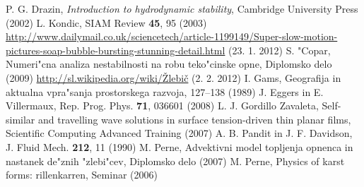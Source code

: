 \documentclass[a4paper,12pt]{article}
\begin{document}
\begin{thebibliography}{3}
   P. G. Drazin, \textit{Introduction to hydrodynamic stability}, Cambridge University Press (2002)
   L. Kondic, SIAM Review \textbf{45}, 95 (2003)
   \url{http://www.dailymail.co.uk/sciencetech/article-1199149/Super-slow-motion-pictures-soap-bubble-bursting-stunning-detail.html} (23. 1. 2012)
   S. "Copar, Numeri"cna analiza nestabilnosti na robu teko"cinske opne, Diplomsko delo (2009)
   \href{http://sl.wikipedia.org/wiki/\%C5\%BDlebi\%C4\%8Di}{http://sl.wikipedia.org/wiki/\v Zlebič} (2. 2. 2012)
   I. Gams, Geografija in aktualna vpra"sanja prostorskega razvoja, 127--138 (1989)
   J. Eggers in E. Villermaux, Rep. Prog. Phys. \textbf{71}, 036601 (2008)
   L. J. Gordillo Zavaleta, Self-similar and travelling wave solutions in surface tension-driven thin planar films, Scientific Computing Advanced Training (2007)
   A. B. Pandit in J. F. Davidson, J. Fluid Mech. \textbf{212}, 11 (1990)
   M. Perne, Advektivni model topljenja opnenca in nastanek de"znih "zlebi"cev, Diplomsko delo (2007)
   M. Perne, Physics of karst forms: rillenkarren, Seminar (2006)
\end{thebibliography}
\end{document}
